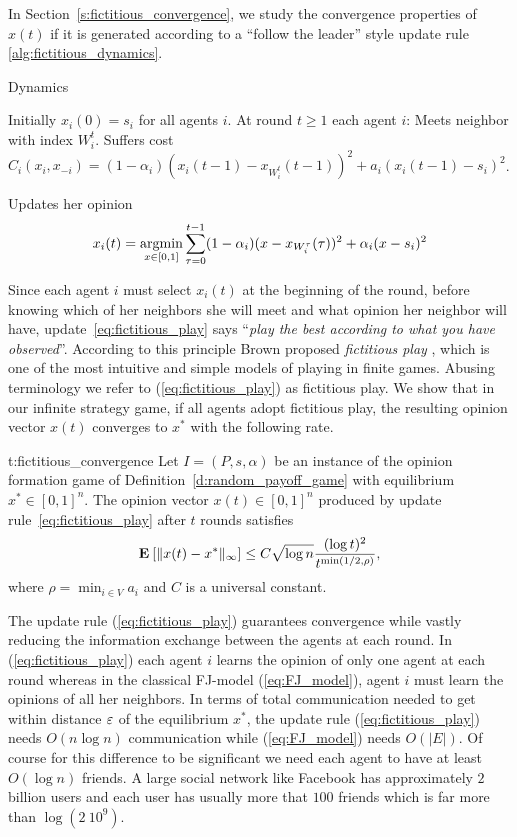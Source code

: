 In Section~\ref{s:fictitious_convergence}, we study the convergence properties
of $x(t)$ if it is generated according to a \enquote{follow the leader}
style update rule \ref{alg:fictitious_dynamics}.
\begin{algorithm}
  \caption{Dynamics}
  \label{alg:fictitious_dynamics}
  \begin{algorithmic}[1]
    \STATE Initially $x_i(0) = s_i$ for all agents $i$.
    \STATE At round $t\geq 1$ each agent $i$:
    \bindent
    \STATE Meets neighbor with index $W_i^t$.
  \STATE Suffers cost \( C_i(x_i,x_{-i}) = (1-\alpha_i) (x_i(t-1) - x_{W_i^t}(t-1))^2 + a_i (x_i(t-1) - s_i)^2\).
  \item Updates her opinion
    \begin{equation}\label{eq:fictitious_play}
      x_i(t) =
      \operatorname*{argmin}_{x \in [0,1]}
      \sum_{\tau=0}^{t-1}(1-\alpha_i)(x-x_{W_i^\tau}(\tau))^2+\alpha_i(x-s_i)^2
    \end{equation}
    \eindent
  \end{algorithmic}
\end{algorithm}
%
Since each agent $i$ must select $x_i(t)$ at the beginning of the round, before knowing
which of her neighbors she will meet and what opinion her neighbor will have,
update~\ref{eq:fictitious_play} says
\enquote{\emph{play the best according to what you have observed}}.
According to this principle Brown proposed \emph{fictitious play}
\cite{Bro51}, which is one of the most intuitive and simple
models of playing in finite games. Abusing terminology
we refer to (\ref{eq:fictitious_play}) as fictitious play.
We show that in our infinite strategy game, if all agents
adopt fictitious play, the resulting opinion vector $x(t)$ converges to
$x^*$ with the following rate.
%
\begin{reptheorem}{t:fictitious_convergence}
  Let $I = (P,s, \alpha)$ be an instance of the opinion formation
  game of Definition~\ref{d:random_payoff_game} with equilibrium
  $x^* \in [0,1]^n$.  The opinion vector $x(t)\in[0,1]^n$ produced by
  update rule~\ref{eq:fictitious_play} after $t$ rounds satisfies
  \[
    \bm{\mathrm{E}}_{} \left[ \| x(t) - x^* \|_{\infty} \right] \leq
    C \sqrt{\log n}\frac{(\log t)^{2}}{t^{\min(1/2,\rho)}},
  \]
  where $\rho = \min_{i \in V} a_i$ and $C$ is a universal constant.
\end{reptheorem}

The update rule (\ref{eq:fictitious_play}) guarantees convergence
while vastly reducing the information exchange between the agents
at each round. In (\ref{eq:fictitious_play}) each agent $i$ learns the opinion of only one agent
at each round whereas in the classical FJ-model (\ref{eq:FJ_model}), agent $i$ must
learn the opinions of all her neighbors. In terms of
total communication needed to get within distance $\varepsilon$ of the
equilibrium $x^*$, the update rule (\ref{eq:fictitious_play}) needs
$O(n \log n)$ communication while (\ref{eq:FJ_model}) needs
$O(|E|)$. Of course for this difference to be significant we need
each agent to have at least $O(\log n)$ friends. A large social
network like Facebook has approximately $2$ billion users and each user
has usually more that $100$ friends which is far more than $\log(2\ 10^9)$.

